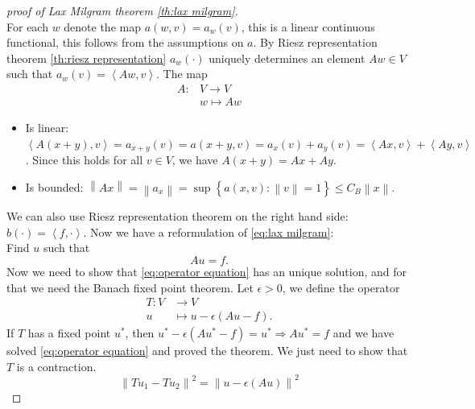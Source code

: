 \documentclass[../Main/main.tex]{subfiles}
\begin{document}
	\begin{proof}[proof of Lax Milgram theorem \ref{th:lax milgram}]
		$ $\\
		For each $w$ denote the map $a(w,v) = a_w(v)$, this is a linear continuous functional, this follows from the assumptions on $a$. By Riesz representation theorem \ref{th:riesz representation} $a_w(\cdot)$ uniquely determines an element $Aw \in V$ such that $a_w(v) = \left \langle Aw,v \right \rangle$. The map
		\begin{equation*}
			\begin{aligned}
				A:&V\rightarrow V \\
				&w \mapsto Aw
			\end{aligned}
		\end{equation*}
		\begin{itemize}
			\item 		Is linear: $\left \langle A(x+y),v  \right \rangle = a_{x+y}(v) = a(x+y,v) = a_x(v)+a_y(v) = \left \langle Ax,v \right \rangle+\left \langle Ay,v \right \rangle$. Since this holds for all $v \in V$, we have $A(x+y)=Ax + Ay$.
			\item Is bounded: $\left \| Ax \right \|=\left \| a_x \right \| = \sup \left \{ a(x,v):\left \| v \right \|=1 \right \} \leq C_B \left \| x \right \|$.
		\end{itemize}
		We can also use Riesz representation theorem on the right hand side: $b(\cdot)=\left \langle f,\cdot \right \rangle$. Now we have a reformulation of \eqref{eq:lax milgram}:\\
		Find $u$ such that
		\begin{equation}\label{eq:operator equation}
			Au = f.
		\end{equation}
		Now we need to show that \eqref{eq:operator equation} has an unique solution, and for that we need the Banach fixed point theorem. Let $\epsilon > 0$, we define the operator 
		\begin{equation*}
			\begin{aligned}
				T:V &\rightarrow V \\
				u &\mapsto u-\epsilon (Au-f).
			\end{aligned}
		\end{equation*}
		If $T$ has a fixed point $u^*$, then $u^*-\epsilon(Au^*-f)=u^* \Rightarrow Au^* =f$ and we have solved \eqref{eq:operator equation} and proved the theorem. We just need to show that $T$ is a contraction.
		\begin{equation*}
			\left \| Tu_1 - Tu_2 \right \|^2 = \left \| u-\epsilon(Au) \right \|^2 

\end{equation*}
\end{proof}
\end{document}

